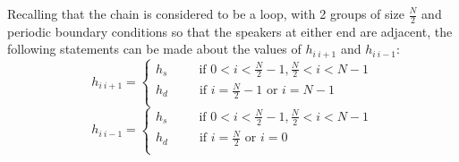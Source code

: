 \documentclass[12pt]{article}
\begin{document}
Recalling that the chain is considered to be a loop, with 2 groups of size $\frac{N}{2}$ and periodic boundary conditions so that the speakers at either end are adjacent, the following statements can be made about the values of $h_{i \ i+1}$ and $h_{i \ i-1}$:
\begin{equation} \label{hi1}
h_{i \ i+1} = \begin{cases}
h_s \ \ \ \phantom{blah} \text{if $0 < i < \frac{N}{2}-1, \frac{N}{2} < i < N-1$} \\
h_d \ \ \ \phantom{blah} \text{if $i = \frac{N}{2} -1 $ or $i = N-1$} \\
\end{cases}
\end{equation} 
\begin{equation} \label{hi2}
h_{i \ i-1} = \begin{cases}
h_s \ \ \ \phantom{blah} \text{if $0 < i < \frac{N}{2}-1, \frac{N}{2} < i < N-1$} \\
h_d \ \ \ \phantom{blah} \text{if $i = \frac{N}{2} $ or $i = 0$} \\
\end{cases}
\end{equation}
\end{document}
